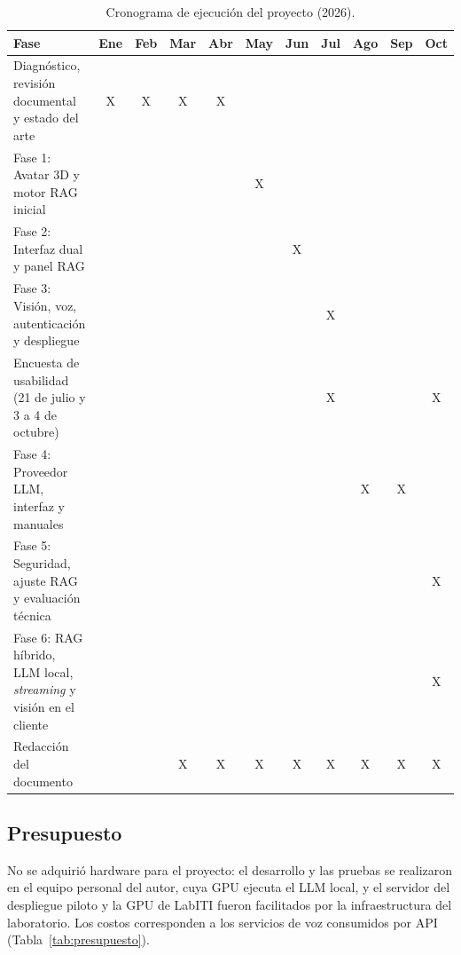 \begin{table}[H]
  \caption{Cronograma de ejecución del proyecto (2026).}
  \label{tab:cronograma}
  \centering
  \small
  \setlength{\tabcolsep}{3pt}
  \renewcommand{\arraystretch}{1.2}
  \begin{tabular}{|>{\raggedright\arraybackslash}p{4.4cm}|c|c|c|c|c|c|c|c|c|c|}
    \hline
    \rowcolor[HTML]{EFEFEF}
    \textbf{Fase} & \textbf{Ene} & \textbf{Feb} & \textbf{Mar} & \textbf{Abr} & \textbf{May} & \textbf{Jun} & \textbf{Jul} & \textbf{Ago} & \textbf{Sep} & \textbf{Oct} \\ \hline
    Diagnóstico, revisión documental y estado del arte & X & X & X & X & & & & & & \\ \hline
    Fase 1: Avatar 3D y motor RAG inicial & & & & & X & & & & & \\ \hline
    Fase 2: Interfaz dual y panel RAG & & & & & & X & & & & \\ \hline
    Fase 3: Visión, voz, autenticación y despliegue & & & & & & & X & & & \\ \hline
    Encuesta de usabilidad (21 de julio y 3 a 4 de octubre) & & & & & & & X & & & X \\ \hline
    Fase 4: Proveedor LLM, interfaz y manuales & & & & & & & & X & X & \\ \hline
    Fase 5: Seguridad, ajuste RAG y evaluación técnica & & & & & & & & & & X \\ \hline
    Fase 6: RAG híbrido, LLM local, \textit{streaming} y visión en el cliente & & & & & & & & & & X \\ \hline
    Redacción del documento & & & X & X & X & X & X & X & X & X \\ \hline
  \end{tabular}
  \elaboradopor{\autorTFG}
\end{table}

\subsection{Presupuesto}
No se adquirió hardware para el proyecto: el desarrollo y las pruebas se realizaron en el equipo personal del autor, cuya GPU ejecuta el LLM local, y el servidor del despliegue piloto y la GPU de LabITI fueron facilitados por la infraestructura del laboratorio. Los costos corresponden a los servicios de voz consumidos por API (Tabla~\ref{tab:presupuesto}).

